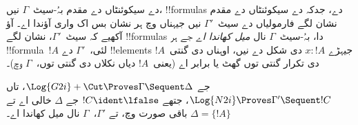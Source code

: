 \documentclass[../../../include/open-logic-section]{subfiles}
\begin{document}


 دے سیکوئنٹاں دے مقدم بہُ-سیٹ~$\Gamma$ نیں، !!{formula}s دے، جدکہ  دے سیکوئنٹاں دے مقدم نشان لگے فارمولیاں دے سیٹ~$\Gamma'$ نیں جیہناں وچ ہر نشان بس اک واری آؤندا اے۔ آؤ آکھیے کہ سیٹ~$\Gamma'$، نشان لگے !!{formula}s دا، بہُ-سیٹ~$\Gamma$ نال \emph{میل کھاندا اے} جے ہر !!{formula}~$!A$ لئی،~$\Gamma'$ دے !!{element}s جیہڑے $x : !A$ دی شکل دے نیں، اوہناں دی گنتی~$!A$ دی تکرار گنتی توں گھٹ یا برابر اے (یعنی~$!A$ دیاں نکلاں دی گنتی توں،~$\Gamma$ وچ)۔

\begin{prop}
جے $\Log{G2i} + \Cut \Proves \Gamma \Sequent \Delta$، تاں $\Log{N2i}
\Proves \Gamma' \Sequent !C$، جتھے $!C \ident \lfalse$ جے $\Delta$ خالی اے تے $\Delta = \{!A\}$ باقی صورت وچ، تے $\Gamma'$،~$\Gamma$ نال میل کھاندا اے۔
\end{prop}
\end{document}
